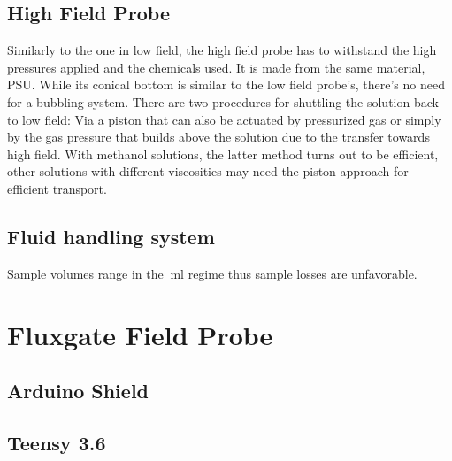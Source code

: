 		\subsection{High Field Probe}
			Similarly to the one in low field, the high field probe has to withstand the high
			pressures applied and the chemicals used. It is made from the same material, PSU. While
			its conical bottom is similar to the low field probe's, there's no need for a bubbling
			system. There are two procedures for shuttling the solution back to low field: Via a
			piston that can also be actuated by pressurized gas or simply by the gas pressure that
			builds above the solution due to the transfer towards high field. With methanol
			solutions, the latter method turns out to be efficient, other solutions with different
			viscosities may need the piston approach for efficient transport.
		\subsection{Fluid handling system} 
			Sample volumes range in the $\SI{}{\milli\litre}$ regime thus sample losses are
			unfavorable.
	\section{Fluxgate Field Probe}\label{sec:methodsFluxgate}
		\subsection{Arduino Shield}
		\subsection{Teensy 3.6}
%
